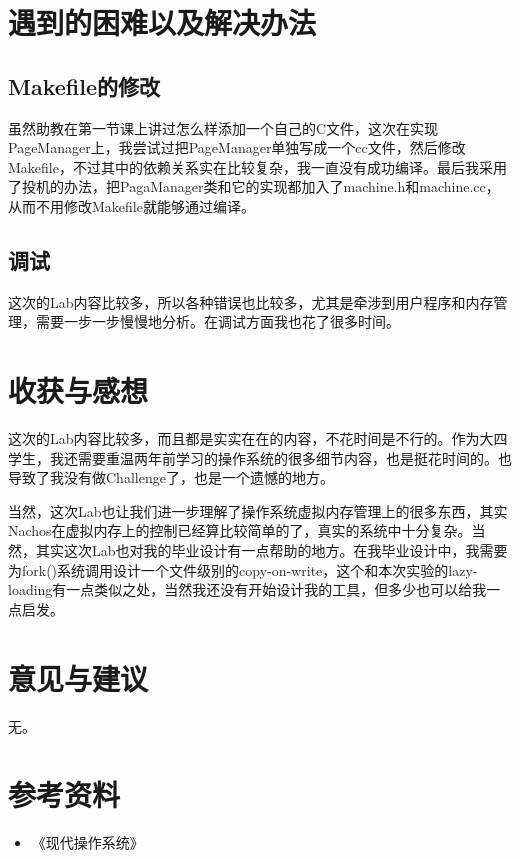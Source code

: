 \documentclass[nofonts]{ctexart}
\begin{document}
\section{遇到的困难以及解决办法}
\subsection*{Makefile的修改}
虽然助教在第一节课上讲过怎么样添加一个自己的C文件，这次在实现PageManager上，我尝试过把PageManager单独写成一个cc文件，然后修改Makefile，不过其中的依赖关系实在比较复杂，我一直没有成功编译。最后我采用了投机的办法，把PagaManager类和它的实现都加入了machine.h和machine.cc，从而不用修改Makefile就能够通过编译。
\subsection*{调试}
这次的Lab内容比较多，所以各种错误也比较多，尤其是牵涉到用户程序和内存管理，需要一步一步慢慢地分析。在调试方面我也花了很多时间。

\section{收获与感想}

这次的Lab内容比较多，而且都是实实在在的内容，不花时间是不行的。作为大四学生，我还需要重温两年前学习的操作系统的很多细节内容，也是挺花时间的。也导致了我没有做Challenge了，也是一个遗憾的地方。

当然，这次Lab也让我们进一步理解了操作系统虚拟内存管理上的很多东西，其实Nachos在虚拟内存上的控制已经算比较简单的了，真实的系统中十分复杂。当然，其实这次Lab也对我的毕业设计有一点帮助的地方。在我毕业设计中，我需要为fork()系统调用设计一个文件级别的copy-on-write，这个和本次实验的lazy-loading有一点类似之处，当然我还没有开始设计我的工具，但多少也可以给我一点启发。

\section{意见与建议}
无。

\section{参考资料}
\begin{itemize}
\item 《现代操作系统》
\end{itemize}
\end{document}

